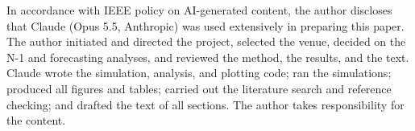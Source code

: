 In accordance with IEEE policy on AI-generated content, the author discloses that Claude (Opus 5.5, Anthropic) was used extensively in preparing this paper. The author initiated and directed the project, selected the venue, decided on the N-1 and forecasting analyses, and reviewed the method, the results, and the text. Claude wrote the simulation, analysis, and plotting code; ran the simulations; produced all figures and tables; carried out the literature search and reference checking; and drafted the text of all sections. The author takes responsibility for the content.
